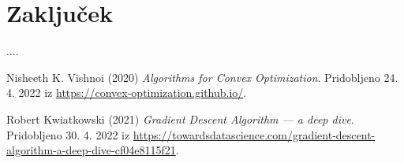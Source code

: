 \documentclass{article}
\begin{document}
\newpage
\section{Zaključek}
....
%
%


\begin{thebibliography}{9}
Nisheeth K. Vishnoi (2020) \emph{Algorithms for Convex Optimization}. Pridobljeno 24. 4. 2022 iz \url{https://convex-optimization.github.io/}.

Robert Kwiatkowski (2021) \emph{Gradient Descent Algorithm — a deep dive}. Pridobljeno 30. 4. 2022 iz \url{https://towardsdatascience.com/gradient-descent-algorithm-a-deep-dive-cf04e8115f21}.

\end{thebibliography}
\end{document}
